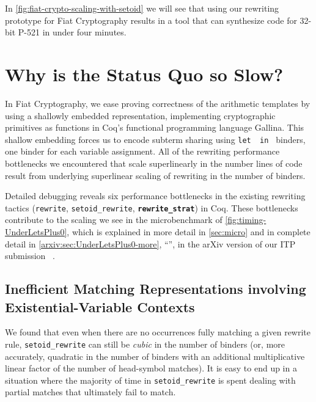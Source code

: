 \documentclass[sn-mathphys,pdflatex]{sn-jnl}%
\makeatletter
\newcommand{\tacsetoidrewrite}{\texttt{setoid_rewrite}}
\newcommand{\tacrewritestrat}{\textbf{\texttt{rewrite\_strat}}}
\newcommand{\letin}[1][{\ensuremath{\cdots}}{\ensuremath{\cdots}}]{%
  \texttt{let }\@firstoftwo#1\texttt{ in }\@secondoftwo#1
}
\newcommand{\arxivautonameref}[1]{\autoref*{arxiv:#1}, ``\nameref*{arxiv:#1}''}
\newcommand{\arxivautoreflong}[1]{\arxivautonameref{#1}, in the arXiv version of our ITP submission~\cite{RewritingITP2022}%
\let\arxivautoref\arxivautorefshort}
\newcommand{\arxivautorefshort}[1]{\arxivautonameref{#1}, in~\cite{RewritingITP2022}}
\let\arxivautoref\arxivautoreflong
\theoremstyle{thmstyleone}%
\theoremstyle{thmstyletwo}%
\theoremstyle{thmstylethree}%
\makeatother
\begin{document}
In \autoref{fig:fiat-crypto-scaling-with-setoid} we will see that using our rewriting prototype for Fiat Cryptography results in a tool that can synthesize code for 32-bit P-521 in under four minutes.

\section{Why is the Status Quo so Slow?}\label{sec:why-status-quo-bad}\label{sec:setoid-rewrite-bottlenecks}



In Fiat Cryptography, we ease proving correctness of the arithmetic templates by using a shallowly embedded representation, implementing cryptographic primitives as functions in Coq's functional programming language Gallina.
This shallow embedding forces us to encode subterm sharing using \letin{} binders, one binder for each variable assignment.
All of the rewriting performance bottlenecks we encountered that scale superlinearly in the number lines of code result from underlying superlinear scaling of rewriting in the number of binders.

Detailed debugging reveals six performance bottlenecks in the existing rewriting tactics (\texttt{rewrite}, \tacsetoidrewrite{}, \tacrewritestrat{}) in Coq.
These bottlenecks contribute to the scaling we see in the microbenchmark of \autoref{fig:timing-UnderLetsPlus0}, which is explained in more detail in \autoref{sec:micro} and in complete detail in \arxivautoreflong{sec:UnderLetsPlus0-more}.

\subsection{Inefficient Matching Representations involving Existential-Variable Contexts}

We found that even when there are no occurrences fully matching a given rewrite rule, \tacsetoidrewrite{} can still be \emph{cubic} in the number of binders (or, more accurately, quadratic in the number of binders with an additional multiplicative linear factor of the number of head-symbol matches).
It is easy to end up in a situation where the majority of time in \tacsetoidrewrite{} is spent dealing with partial matches that ultimately fail to match.
\end{document}

